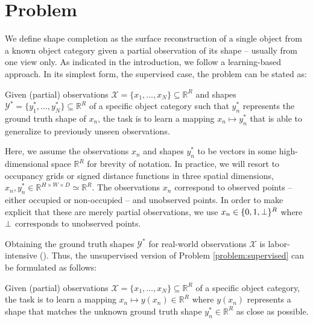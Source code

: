 \chapter{Problem}
\label{ch:problem}

We define shape completion as the surface reconstruction of a single object
from a known object category given a partial observation of its shape
-- usually from one view only.
As indicated in the introduction, we follow a learning-based approach.
In its simplest form, \ie the supervised case, the problem can be
stated as:

\begin{problem}%
  \label{problem:supervised}
  Given (partial) observations $\mathcal{X} = \{x_1,\ldots,x_N\} \subseteq \mathbb{R}^R$ and
  shapes $\mathcal{Y}^* = \{y^*_1, \ldots, y^*_N\} \subseteq \mathbb{R}^R$ of a specific
  object category such that
  $y^*_n$ represents the ground truth shape of $x_n$, the task is to learn a 
  mapping $x_n \mapsto y^*_n$ that is able to generalize to previously unseen
  observations.
\end{problem}

Here, we assume the observations $x_n$ and shapes $y^*_n$ to be vectors in
some high-dimensional space $\mathbb{R}^R$ for brevity of notation. In practice,
we will resort to occupancy grids or signed distance functions in three spatial
dimensions, \eg $x_n, y^*_n \in \mathbb{R}^{H \times W \times D} \simeq \mathbb{R}^R$.
The observations $x_n$ correspond to observed points -- either
occupied or non-occupied -- and unobserved points. In order to make explicit
that these are merely partial observations, we use $x_n \in \{0,1,\bot\}^R$
where $\bot$ corresponds to unobserved points.

Obtaining the ground truth shapes $\mathcal{Y}^*$ for real-world
observations $\mathcal{X}$ is labor-intensive
(\cf \cite{GuptaMalik:2015,MenzeGeiger:2015}).
Thus, the unsupervised version of Problem \ref{problem:supervised} can be formulated
as follows:

\begin{problem}%
  \label{problem:unsupervised}
  Given (partial) observations $\mathcal{X} = \{x_1,\ldots,x_N\} \subseteq \mathbb{R}^R$
  of a specific object category,
  the task is to learn a mapping $x_n \mapsto y(x_n) \in \mathbb{R}^R$ where
  $y(x_n)$ represents a shape that matches the unknown ground truth
  shape $y^*_n \in \mathbb{R}^R$ as close as possible.
\end{problem}

